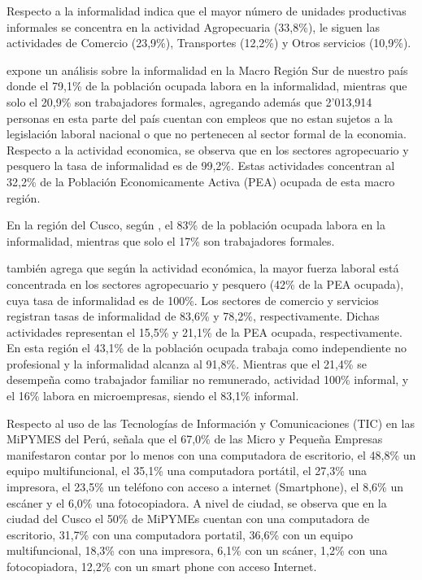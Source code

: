 Respecto a la informalidad \cite{inei2} indica que el mayor n\'umero de unidades
productivas informales se concentra en la actividad Agropecuaria (33,8\%), le
siguen las actividades de Comercio (23,9\%), Transportes (12,2\%) y Otros servicios (10,9\%).

\cite{perucamaras} expone un an\'alisis sobre la informalidad en la Macro Regi\'on
Sur de nuestro pa\'is donde el 79,1\% de la poblaci\'on ocupada labora en la informalidad,
mientras que solo el 20,9\% son trabajadores formales, agregando adem\'as que
2'013,914 personas en esta parte del pa\'is cuentan con empleos que no estan sujetos
a la legislaci\'on laboral nacional o que no pertenecen al sector formal de la
economia. Respecto a la actividad economica, se observa que en los sectores agropecuario
y pesquero la tasa de informalidad es de 99,2\%. Estas actividades concentran al
32,2\% de la Poblaci\'on Economicamente Activa (PEA) ocupada de esta macro regi\'on.

En la regi\'on del Cusco, seg\'un \cite{perucamaras}, el 83\% de la poblaci\'on
ocupada labora en la informalidad, mientras que solo el 17\% son trabajadores formales.

\cite{perucamaras} tambi\'en agrega que seg\'un la actividad econ\'omica, la mayor
fuerza laboral est\'a concentrada en los sectores agropecuario y pesquero (42\% de
la PEA ocupada), cuya tasa de informalidad es de 100\%. Los sectores de comercio
y servicios registran tasas de informalidad de 83,6\% y 78,2\%, respectivamente.
Dichas actividades representan el 15,5\% y 21,1\% de la PEA ocupada, respectivamente.
En esta regi\'on el 43,1\% de la poblaci\'on ocupada trabaja como independiente no
profesional y la informalidad alcanza al 91,8\%. Mientras que el 21,4\% se desempe\~na
como trabajador familiar no remunerado, actividad 100\% informal, y el 16\% labora en
microempresas, siendo el 83,1\% informal.

Respecto al uso de las Tecnolog\'ias de Informaci\'on y Comunicaciones (TIC) en las
MiPYMES del Per\'u, \cite{inei1} se\~nala que el 67,0\% de las Micro y Peque\~na Empresas
manifestaron contar por lo menos con una computadora de escritorio, el 48,8\% un
equipo multifuncional, el 35,1\% una computadora port\'atil, el 27,3\% una impresora,
el 23,5\% un tel\'efono con acceso a internet (Smartphone), el 8,6\% un esc\'aner y
el 6,0\% una fotocopiadora. A  nivel  de  ciudad,  se  observa  que  en la ciudad
del Cusco el 50\% de MiPYMEs cuentan con una computadora de escritorio, 31,7\% con
una computadora portatil, 36,6\% con un equipo multifuncional, 18,3\% con una impresora,
6,1\% con un sc\'aner, 1,2\% con una fotocopiadora, 12,2\% con un smart phone con acceso
Internet.

